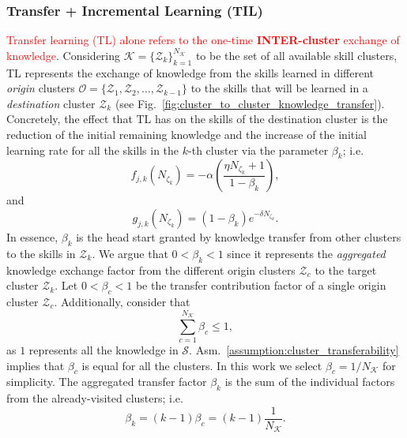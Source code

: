 \subsubsection{\textbf{Transfer + Incremental Learning (TIL)}}
\textcolor{red}{Transfer learning (TL) alone refers to the one-time \textbf{INTER-cluster} exchange of knowledge}. Considering $\mathcal{K} = \{ \mathcal{Z}_k \}^{N_\mathcal{K}}_{k=1}$ to be the set of all available skill clusters, TL represents the exchange of knowledge from the skills learned in different \emph{origin} clusters $\mathcal{O} = \{ \mathcal{Z}_1,\mathcal{Z}_2,\ldots,\mathcal{Z}_{k-1} \}$ to the skills that will be learned in a \emph{destination} cluster $\mathcal{Z}_k$ (see Fig.~\ref{fig:cluster_to_cluster_knowledge_transfer}). Concretely, the effect that TL has on the skills of the destination cluster is the reduction of the initial remaining knowledge and the increase of the initial learning rate for all the skills in the $k$-th cluster via the parameter $\beta_k$; i.e.
\begin{equation}\label{eq:f_function_transfer}
	f_{j,k}\left(N_{\zeta_k}\right) = -\alpha \left( \frac{\eta N_{\zeta_k} + 1}{1 - \beta_k} \right),
\end{equation}
and
\begin{equation}\label{eq:g_function_transfer}
	g_{j,k}\left(N_{\zeta_k}\right) = (1-\beta_k) e^{-\delta N_{\zeta_k}}.
\end{equation}
In essence, $\beta_k$ is the head start granted by knowledge transfer from other clusters to the skills in $\mathcal{Z}_k$. We argue that  $0<\beta_{k} < 1$ since it represents the \emph{aggregated} knowledge exchange factor from the different origin clusters $\mathcal{Z}_{c}$ to the target cluster $\mathcal{Z}_{k}$. Let $0<\beta_{c} < 1$ be the transfer contribution factor of a single origin cluster $\mathcal{Z}_c$. Additionally, consider that
\begin{equation}
	\sum\limits_{c=1}^{N_\mathcal{K}}\beta_{c} \leq 1,
\end{equation}
as $1$ represents all the knowledge in $\mathcal{S}$. Asm.~\ref{assumption:cluster_transferability} implies that $\beta_c$ is equal for all the clusters. In this work we select $\beta_c = 1/N_\mathcal{K}$ for simplicity. The aggregated transfer factor $\beta_k$ is the sum of the individual factors from the already-visited clusters; i.e.
\begin{equation}\label{eq:beta_k_transfer}
	\beta_{k}= \left(k-1\right)\beta_c = \left(k-1\right)\frac{1}{N_\mathcal{K}}.
\end{equation}

